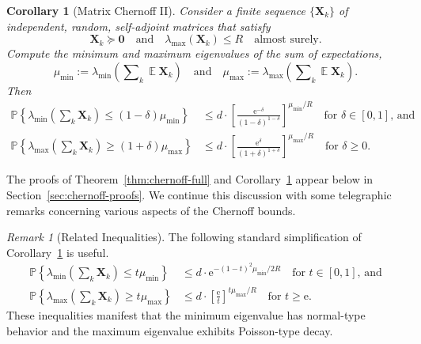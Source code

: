 \documentclass[11pt,letterpaper,twoside,reqno,draft]{amsart}
\newtheorem{cor}[thm]{Corollary}
\theoremstyle{remark}
\newtheorem{rem}[thm]{Remark}
\numberwithin{equation}{section}
\numberwithin{thm}{section}
\begin{document}
\begin{cor}[Matrix Chernoff II] \label{cor:chernoff}
Consider a finite sequence $\{ {\bm{{X}}}_k \}$ of independent, random, self-adjoint matrices that satisfy
$$
{\bm{{X}}}_k {\succcurlyeq} {\bm{{0}}}
\quad\text{and}\quad
\lambda_{\max}({\bm{{X}}}_k) \leq R
\quad\text{almost surely}.
$$
Compute the minimum and maximum eigenvalues of the sum of expectations,
$$
\mu_{\min} := \lambda_{\min}\left( \sum\nolimits_{k} {\operatorname{\mathbb{E}}} {\bm{{X}}}_k \right)
\quad\text{and}\quad
\mu_{\max} := \lambda_{\max}\left( \sum\nolimits_{k} {\operatorname{\mathbb{E}}} {\bm{{X}}}_k \right).
$$
Then
\begin{align*}
{\mathbb{P}\left\{ {{ \lambda_{\min}\left(\sum\nolimits_k {\bm{{X}}}_k \right) \leq (1 - \delta) \mu_{\min} }} \right\}}
	&\leq d \cdot \left[ \frac{{\mathrm{e}}^{-\delta}}{(1 - \delta)^{1-\delta}} \right]^{\mu_{\min}/R} 
	\quad\text{for $\delta \in [0, 1]$, and} \\%
{\mathbb{P}\left\{ {{ \lambda_{\max}\left( \sum\nolimits_k {\bm{{X}}}_k \right) \geq (1 + \delta) \mu_{\max} }} \right\}}
	&\leq d \cdot \left[ \frac{{\mathrm{e}}^{\delta}}{(1 + \delta)^{1+\delta}} \right]^{\mu_{\max} / R} 
	\quad\text{for $\delta \geq 0$.} 
\end{align*}
\end{cor}

The proofs of Theorem~\ref{thm:chernoff-full} and Corollary~\ref{cor:chernoff} appear below in Section~\ref{sec:chernoff-proofs}.  We continue this discussion with some telegraphic remarks concerning various aspects of the Chernoff bounds.

\begin{rem}[Related Inequalities]
The following standard simplification of Corollary~\ref{cor:chernoff} is useful. 
\begin{align*}
{\mathbb{P}\left\{ {{ \lambda_{\min}\left(\sum\nolimits_k {\bm{{X}}}_k \right)
	\leq t \mu_{\min} }} \right\}}
	&\leq d \cdot {\mathrm{e}}^{-(1-t)^2 \mu_{\min}/2R}
	\quad\text{for $t \in [0, 1]$, and} \\
{\mathbb{P}\left\{ {{ \lambda_{\max}\left(\sum\nolimits_{k} {\bm{{X}}}_k \right)
	\geq t \mu_{\max} }} \right\}}
	&\leq d \cdot \left[ \frac{\mathrm{e}}{t} \right]^{t \mu_{\max}/R}
\quad\text{for $t \geq {\mathrm{e}}$.}
\end{align*}
These inequalities manifest that the minimum eigenvalue has normal-type behavior and the maximum eigenvalue exhibits Poisson-type decay.

\end{rem}
\end{document}
